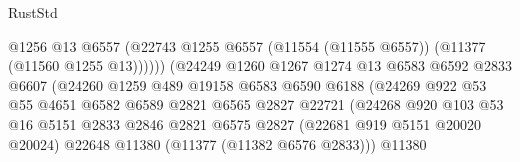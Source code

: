 \begin{lexlean}{RustStd}
\begin{coremodule}
                                            @1256
                                            @13
                                            @6557
                                            (@22743
                                              @1255
                                              @6557
                                              (@11554 (@11555 @6557))
                                              (@11377 (@11560 @1255 @13))))))
                                      (@24249
                                        @1260
                                        @1267
                                        @1274
                                        @13
                                        @6583
                                        @6592
                                        @2833
                                        @6607
                                        (@24260
                                          @1259
                                          @489
                                          @19158
                                          @6583
                                          @6590
                                          @6188
                                          (@24269
                                            @922
                                            @53
                                            @55
                                            @4651
                                            @6582
                                            @6589
                                            @2821
                                            @6565
                                            @2827
                                            @22721
                                            (@24268
                                              @920
                                              @103
                                              @53
                                              @16
                                              @5151
                                              @2833
                                              @2846
                                              @2821
                                              @6575
                                              @2827
                                              (@22681 @919 @5151 @20020 @20024)
                                              @22648
                                              @11380
                                              (@11377 (@11382 @6576 @2833)))
                                            @11380

\end{coremodule}
\end{lexlean}
